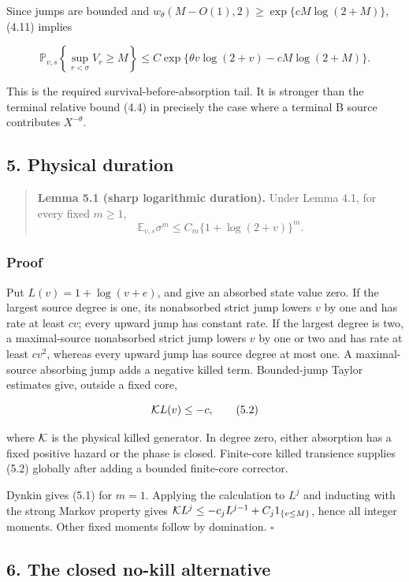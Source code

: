 Since jumps are bounded and
\(w_\theta(M-O(1),2)\ge\exp\{cM\log(2+M)\}\), (4.11) implies

\[
 \mathbb P_{v,s}\!\left\{\sup_{r<\sigma}V_r\ge M\right\}
 \le C\exp\{\theta v\log(2+v)-cM\log(2+M)\}.         \tag{4.12}
\]

This is the required survival-before-absorption tail. It is stronger
than the terminal relative bound (4.4) in precisely the case where a
terminal B source contributes \(X^{-\theta}\).

\subsection{5. Physical duration}

\begin{quote}
\textbf{Lemma 5.1 (sharp logarithmic duration).} Under Lemma 4.1, for
every fixed \(m\ge1\), \[
                   \mathbb E_{v,s}\sigma^m
      \le C_m\{1+\log(2+v)\}^m.                    \tag{5.1}
\]
\end{quote}

\subsubsection{Proof}

Put \(L(v)=1+\log(v+e)\), and give an absorbed state value zero. If the
largest source degree is one, its nonabsorbed strict jump lowers \(v\)
by one and has rate at least \(cv\); every upward jump has constant
rate. If the largest degree is two, a maximal-source nonabsorbed strict
jump lowers \(v\) by one or two and has rate at least \(cv^2\), whereas
every upward jump has source degree at most one. A maximal-source
absorbing jump adds a negative killed term. Bounded-jump Taylor
estimates give, outside a fixed core,

\[
                        {\cal K}L(v)\le-c,             \tag{5.2}
\]

where \({\cal K}\) is the physical killed generator. In degree zero,
either absorption has a fixed positive hazard or the phase is closed.
Finite-core killed transience supplies (5.2) globally after adding a
bounded finite-core corrector.

Dynkin gives (5.1) for \(m=1\). Applying the calculation to \(L^j\) and
inducting with the strong Markov property gives
\({\cal K}L^j\le-c_jL^{j-1}+C_j1_{\{v\le M\}}\), hence all integer
moments. Other fixed moments follow by domination. \(\square\)

\subsection{6. The closed no-kill
alternative}

